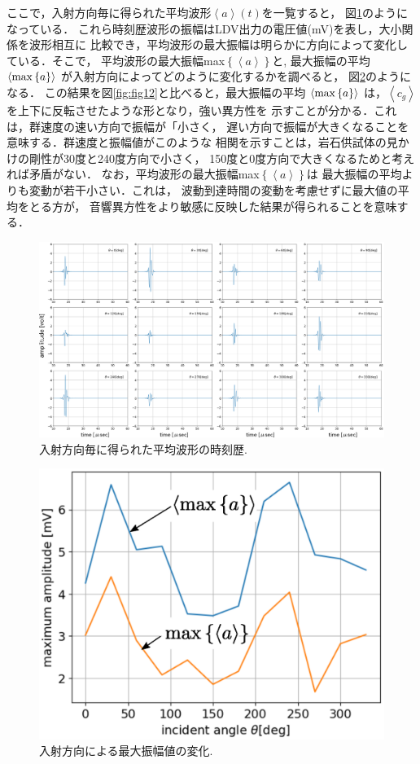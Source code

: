 ここで，入射方向毎に得られた平均波形$\left<a\right>(t)$を一覧すると，
図\ref{fig:fig11_1}のようになっている．
これら時刻歴波形の振幅はLDV出力の電圧値(mV)を表し，大小関係を波形相互に
比較でき，平均波形の最大振幅は明らかに方向によって変化している．そこで，
平均波形の最大振幅max$\left\{ \left< a \right>\right\}$と,
最大振幅の平均$\left< {\rm max}\left\{ a \right\} \right>$
が入射方向によってどのように変化するかを調べると，
図\ref{fig:fig14}のようになる．
この結果を図\ref{fig:fig12}と比べると，最大振幅の平均
$\left<{\rm max}\left\{a\right\}\right>$
は，$\left<c_g\right>$を上下に反転させたような形となり，強い異方性を
示すことが分かる．これは，群速度の速い方向で振幅が「小さく，
遅い方向で振幅が大きくなることを意味する．群速度と振幅値がこのような
相関を示すことは，岩石供試体の見かけの剛性が30度と240度方向で小さく，
150度と0度方向で大きくなるためと考えれば矛盾がない．
なお，平均波形の最大振幅max$\left\{\left<a\right>\right\}$は
最大振幅の平均よりも変動が若干小さい．これは，
波動到達時間の変動を考慮せずに最大値の平均をとる方が，
音響異方性をより敏感に反映した結果が得られることを意味する．
\begin{figure}[h]
	\begin{center}
	\includegraphics[width=1.0\linewidth]{Figs/fig11_1.eps} 
	\end{center}
	\caption{
		入射方向毎に得られた平均波形の時刻歴.
	} 
	\label{fig:fig11_1}
\end{figure}
\begin{figure}[h]
	\begin{center}
	\includegraphics[width=0.8\linewidth]{Figs/fig14.eps} 
	\end{center}
	\caption{
		入射方向による最大振幅値の変化.
	} 
	\label{fig:fig14}
\end{figure}
